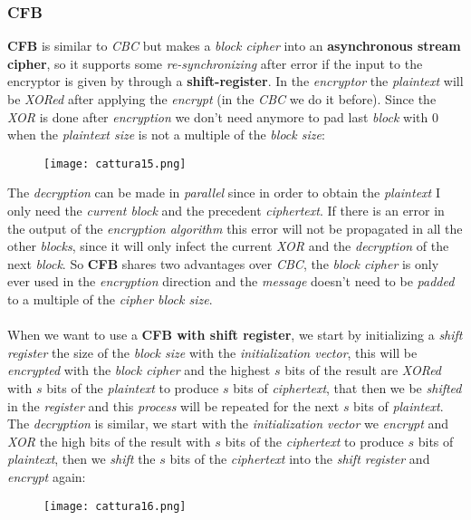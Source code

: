 \documentclass{article}
\begin{document}
\subsubsection{CFB}
\textbf{CFB} is similar to \emph{CBC} but makes a \emph{block cipher} into an \textbf{asynchronous stream cipher}, so it supports some \emph{re-synchronizing} after error if the input to the encryptor is given by through a \textbf{shift-register}. In the \emph{encryptor} the \emph{plaintext} will be \emph{XORed} after applying the \emph{encrypt} (in the \emph{CBC} we do it before). Since the \emph{XOR} is done after \emph{encryption} we don't need anymore to pad last \emph{block} with 0 when the \emph{plaintext size} is not a multiple of the \emph{block size}:
\begin{figure}[H]
  \centering
  \texttt{[image: cattura15.png]}
\end{figure}
The \emph{decryption} can be made in \emph{parallel} since in order to obtain the \emph{plaintext} I only need the \emph{current block} and the precedent \emph{ciphertext}. If there is an error in the output of the \emph{encryption algorithm} this error will not be propagated in all the other \emph{blocks}, since it will only infect the current \emph{XOR} and the \emph{decryption} of the next \emph{block}. So \textbf{CFB} shares two advantages over \emph{CBC}, the \emph{block cipher} is only ever used in the \emph{encryption} direction and the \emph{message} doesn't need to be \emph{padded} to a multiple of the \emph{cipher block size}. \\\\
When we want to use a \textbf{CFB with shift register}, we start by initializing a \emph{shift register} the size of the \emph{block size} with the \emph{initialization vector}, this will be \emph{encrypted} with the \emph{block cipher} and the highest $s$ bits of the result are \emph{XORed} with $s$ bits of the \emph{plaintext} to produce $s$ bits of \emph{ciphertext}, that then we be \emph{shifted} in the \emph{register} and this \emph{process} will be repeated for the next $s$ bits of \emph{plaintext}. The \emph{decryption} is similar, we start with the \emph{initialization vector} we \emph{encrypt} and \emph{XOR} the high bits of the result with $s$ bits of the \emph{ciphertext} to produce $s$ bits of \emph{plaintext}, then we \emph{shift} the $s$ bits of the \emph{ciphertext} into the \emph{shift register} and \emph{encrypt} again:
\begin{figure}[H]
  \centering
  \texttt{[image: cattura16.png]}
\end{figure}
\end{document}
